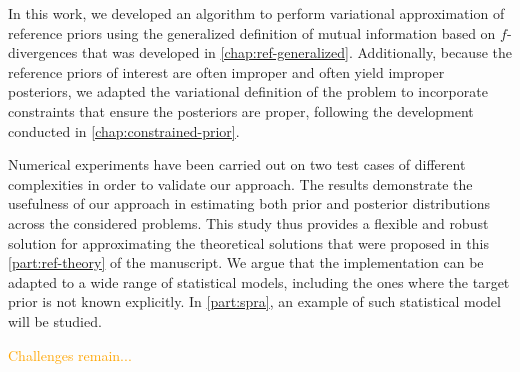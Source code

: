 In this work, we developed an algorithm to perform variational approximation of reference priors using the generalized definition of mutual information based on $f$-divergences that was developed in \cref{chap:ref-generalized}.
Additionally, because the reference priors of interest are often improper and often yield improper posteriors, we adapted the variational definition of the problem to incorporate constraints that ensure the posteriors are proper, following the development conducted in \cref{chap:constrained-prior}. 


Numerical experiments have been carried out on two test cases of different complexities in order to validate our approach.
The results demonstrate the usefulness of our approach in estimating both prior and posterior distributions across the considered problems. %
This study thus provides a flexible and robust solution for approximating the theoretical solutions that were proposed in this \cref{part:ref-theory} of the manuscript.
We argue that the implementation can be adapted to a wide range of statistical models, including the ones where the target prior is not known explicitly.
In \cref{part:spra}, an example of such statistical model will be studied.

\textcolor{orange}{Challenges remain...}
\newpage










